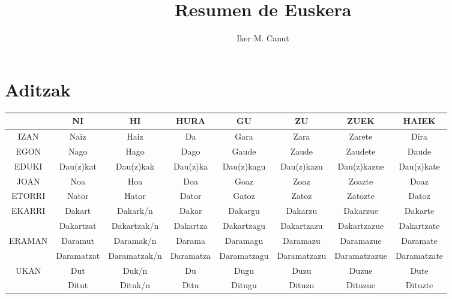\documentclass[12pt, a4paper, landscape]{article}
\begin{document}
\author{Iker M. Canut}
\title{Resumen de Euskera}
\maketitle
\newpage

\tableofcontents
\newpage

\section{Aditzak}
\begin{table}[h]
\begin{center}
\begin{tabular}{|c|c|c|c|c|c|c|c|}
\hline
& NI & HI & HURA & GU & ZU & ZUEK & HAIEK \\
\hline
IZAN & Naiz & Haiz & Da & Gara & Zara & Zarete & Dira \\
\hline
EGON & Nago & Hago & Dago & Gaude & Zaude & Zaudete & Daude \\
\hline
EDUKI & Dau(z)kat & Dau(z)kak & Dau(z)ka & Dau(z)kagu & Dau(z)kazu & Dau(z)kazue & Dau(z)kate \\
\hline
JOAN & Noa & Hoa & Doa & Goaz & Zoaz & Zoazte & Doaz \\
\hline
ETORRI & Nator & Hator & Dator & Gatoz & Zatoz & Zatozte & Datoz \\
\hline
\multirow{2}{*}{EKARRI} & Dakart & Dakark/n & Dakar & Dakargu & Dakarzu & Dakarzue & Dakarte \\ & Dakartzat & Dakartzak/n & Dakartza & Dakartzagu & Dakartzazu & Dakartzazue & Dakartzate \\
\hline
\multirow{2}{*}{ERAMAN} & Daramut & Daramak/n & Darama & Daramagu & Daramazu & Daramazue & Daramate \\ & Daramatzat & Daramatzak/n & Daramatza & Daramatzagu & Daramatzazu & Daramatzazue & Daramatzate \\
\hline
\multirow{2}{*}{UKAN} & Dut & Duk/n & Du & Dugu & Duzu & Duzue & Dute \\ & Ditut & Dituk/n & Ditu & Ditugu & Dituzu & Dituzue & Dituzte \\
\hline
\end{tabular}
\end{center}
\end{table}
\newpage
\end{document}
